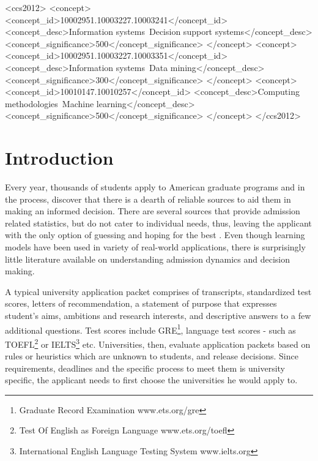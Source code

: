 \documentclass{sig-alternate-05-2015}
\begin{document}
%
%
\begin{CCSXML}
<ccs2012>
<concept>
<concept_id>10002951.10003227.10003241</concept_id>
<concept_desc>Information systems~Decision support systems</concept_desc>
<concept_significance>500</concept_significance>
</concept>
<concept>
<concept_id>10002951.10003227.10003351</concept_id>
<concept_desc>Information systems~Data mining</concept_desc>
<concept_significance>300</concept_significance>
</concept>
<concept>
<concept_id>10010147.10010257</concept_id>
<concept_desc>Computing methodologies~Machine learning</concept_desc>
<concept_significance>500</concept_significance>
</concept>
</ccs2012>
\end{CCSXML}


%
%

%
%
\printccsdesc



\section{Introduction}
\label{sec:intro}
Every year, thousands of students apply to American graduate programs and in the process, discover that there is a dearth of reliable sources to aid them in making an informed decision. There are several sources that provide admission related statistics, but do not cater to individual needs, thus, leaving the applicant with the only option of guessing and hoping for the best \cite{usnews, qs}. Even though learning models have been used in variety of real-world applications, there is surprisingly little literature available on understanding admission dynamics and decision making.

A typical university application packet comprises of transcripts, standardized test scores, letters of recommendation, a statement of purpose that expresses student's aims, ambitions and research interests, and descriptive answers to a few additional questions. Test scores include GRE\footnote{Graduate Record Examination \tiny{www.ets.org/gre}}, language test scores - such as TOEFL\footnote{Test Of English as Foreign Language \tiny{www.ets.org/toefl}} or IELTS\footnote{International English Language Testing System \tiny{www.ielts.org}} etc. Universities, then, evaluate application packets based on rules or heuristics which are unknown to students, and release decisions. Since requirements, deadlines and the specific process to meet them is university specific, the applicant needs to first choose the universities he would apply to.
\end{document}
